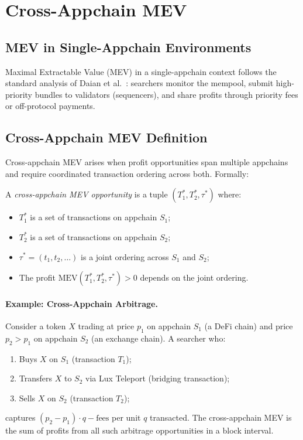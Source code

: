 \section{Cross-Appchain MEV}

\label{sec:mev}

\subsection{MEV in Single-Appchain Environments}

Maximal Extractable Value (MEV) in a single-appchain context follows the standard analysis
of Daian et al.~\cite{daian2020flash}: searchers monitor the mempool, submit high-priority
bundles to validators (sequencers), and share profits through priority fees or off-protocol
payments.

\subsection{Cross-Appchain MEV Definition}

Cross-appchain MEV arises when profit opportunities span multiple appchains and require
coordinated transaction ordering across both. Formally:

\begin{definition}
A \emph{cross-appchain MEV opportunity} is a tuple $(T_1^*, T_2^*, \tau^*)$ where:
\begin{itemize}
  \item $T_1^*$ is a set of transactions on appchain $S_1$;
  \item $T_2^*$ is a set of transactions on appchain $S_2$;
  \item $\tau^* = (t_1, t_2, \ldots)$ is a joint ordering across $S_1$ and $S_2$;
  \item The profit $\text{MEV}(T_1^*, T_2^*, \tau^*) > 0$ depends on the joint ordering.
\end{itemize}
\end{definition}

\paragraph{Example: Cross-Appchain Arbitrage.}
Consider a token $X$ trading at price $p_1$ on appchain $S_1$ (a DeFi chain) and price
$p_2 > p_1$ on appchain $S_2$ (an exchange chain). A searcher who:
\begin{enumerate}[leftmargin=1.5em]
  \item Buys $X$ on $S_1$ (transaction $T_1$);
  \item Transfers $X$ to $S_2$ via Lux Teleport (bridging transaction);
  \item Sells $X$ on $S_2$ (transaction $T_2$);
\end{enumerate}
captures $(p_2 - p_1) \cdot q - \text{fees}$ per unit $q$ transacted. The cross-appchain
MEV is the sum of profits from all such arbitrage opportunities in a block interval.

